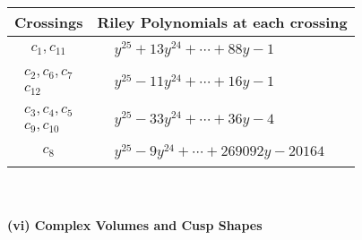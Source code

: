 \documentclass[1p]{elsarticle_modified}
\theoremstyle{definition}
\begin{document}
\begin{tabular}{m{50pt}|m{274pt}}
Crossings & \hspace{64pt}Riley Polynomials at each crossing \\
\hline $$\begin{aligned}c_{1},c_{11}\end{aligned}$$&$\begin{aligned}
&y^{25}+13 y^{24}+\cdots+88 y-1
\end{aligned}$\\
\hline $$\begin{aligned}c_{2},c_{6},c_{7}\\c_{12}\end{aligned}$$&$\begin{aligned}
&y^{25}-11 y^{24}+\cdots+16 y-1
\end{aligned}$\\
\hline $$\begin{aligned}c_{3},c_{4},c_{5}\\c_{9},c_{10}\end{aligned}$$&$\begin{aligned}
&y^{25}-33 y^{24}+\cdots+36 y-4
\end{aligned}$\\
\hline $$\begin{aligned}c_{8}\end{aligned}$$&$\begin{aligned}
&y^{25}-9 y^{24}+\cdots+269092 y-20164
\end{aligned}$\\
\hline
\end{tabular}\\~\\
\newpage\flushleft \textbf{(vi) Complex Volumes and Cusp Shapes}
\end{document}
